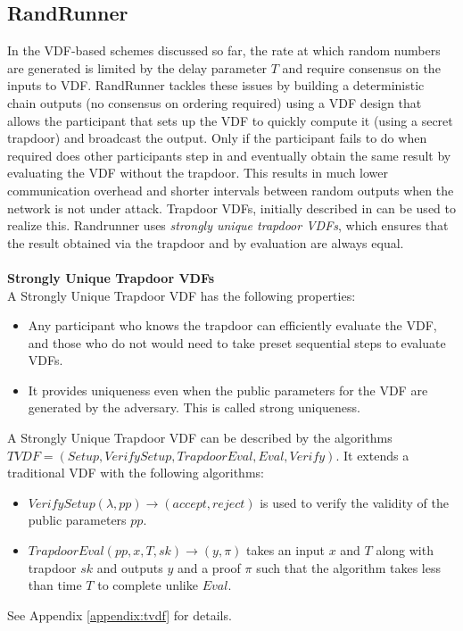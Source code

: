 \documentclass[letterpaper,twocolumn,10pt]{article}
\theoremstyle{definition}
\theoremstyle{remark}
\begin{document}
\subsection{RandRunner}
In the VDF-based schemes discussed so far, the rate at which random numbers are generated is limited by the delay parameter $T$ and require consensus on the inputs to VDF. RandRunner \cite{schindler2021randrunner} tackles these issues by building a deterministic chain outputs (no consensus on ordering required) using a VDF design that allows the participant that sets up the VDF to quickly compute it (using a secret trapdoor) and broadcast the output. Only if the participant fails to do when required does other participants step in and eventually obtain the same result by evaluating the VDF without the trapdoor. This results in much lower communication overhead and shorter intervals between random outputs when the network is not under attack. Trapdoor VDFs, initially described in \cite{wesolowski2019efficient} can be used to realize this. Randrunner uses \emph{strongly unique trapdoor VDFs}, which ensures that the result obtained via the trapdoor and by evaluation are always equal.\\\\
\textbf{Strongly Unique Trapdoor VDFs}\\
A Strongly Unique Trapdoor VDF has the following properties:
\begin{itemize}
    \item Any participant who knows the trapdoor can efficiently evaluate the VDF, and those who do not would need to take preset sequential steps to evaluate VDFs.
    \item It provides uniqueness even when the public parameters for the VDF are generated by the adversary. This is called strong uniqueness. 
\end{itemize}
A Strongly Unique Trapdoor VDF can be described by the algorithms $TVDF = (Setup,VerifySetup, TrapdoorEval, Eval, Verify)$. It extends a traditional VDF with the following algorithms:
\begin{itemize}
    \item $VerifySetup(\lambda, pp) \rightarrow (accept, reject)$ is used to verify the validity of the public parameters $pp$.
    \item $TrapdoorEval(pp,x,T,sk) \rightarrow (y, \pi)$ takes an input $x$ and $T$ along with trapdoor $sk$ and outputs $y$ and a proof $\pi$ such that the algorithm takes less than time $T$ to complete unlike $Eval$.
\end{itemize}
See Appendix \ref{appendix:tvdf} for details.  
\end{document}
